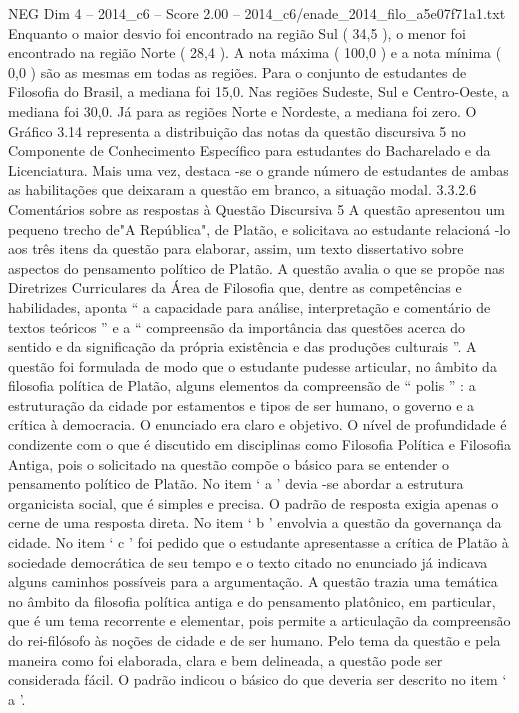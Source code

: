 \begin{textsample}{NEG Dim 4 – 2014\_c6 – Score 2.00 – 2014\_c6/enade\_2014\_filo\_a5e07f71a1.txt}
Enquanto o maior desvio foi encontrado na região Sul ( 34,5 ), o menor foi encontrado na região Norte ( 28,4 ).
A nota máxima ( 100,0 ) e a nota mínima ( 0,0 ) são as mesmas em todas as regiões.
Para o conjunto de estudantes de Filosofia do Brasil, a mediana foi 15,0.
Nas regiões Sudeste, Sul e Centro-Oeste, a mediana foi 30,0.
Já para as regiões Norte e Nordeste, a mediana foi zero.
O Gráfico 3.14 representa a distribuição das notas da questão discursiva 5 no Componente de Conhecimento Específico para estudantes do Bacharelado e da Licenciatura.
Mais uma vez, destaca -se o grande número de estudantes de ambas as habilitações que deixaram a questão em branco, a situação modal. 3.3.2.6 Comentários sobre as respostas à Questão Discursiva 5 A questão apresentou um pequeno trecho de"A República", de Platão, e solicitava ao estudante relacioná -lo aos três itens da questão para elaborar, assim, um texto dissertativo sobre aspectos do pensamento político de Platão.
A questão avalia o que se propõe nas Diretrizes Curriculares da Área de Filosofia que, dentre as competências e habilidades, aponta “ a capacidade para análise, interpretação e comentário de textos teóricos ” e a “ compreensão da importância das questões acerca do sentido e da significação da própria existência e das produções culturais ”.
A questão foi formulada de modo que o estudante pudesse articular, no âmbito da filosofia política de Platão, alguns elementos da compreensão de “ polis ” : a estruturação da cidade por estamentos e tipos de ser humano, o governo e a crítica à democracia.
O enunciado era claro e objetivo.
O nível de profundidade é condizente com o que é discutido em disciplinas como Filosofia Política e Filosofia Antiga, pois o solicitado na questão compõe o básico para se entender o pensamento político de Platão.
No item ‘ a ’ devia -se abordar a estrutura organicista social, que é simples e precisa.
O padrão de resposta exigia apenas o cerne de uma resposta direta.
No item ‘ b ’ envolvia a questão da governança da cidade.
No item ‘ c ’ foi pedido que o estudante apresentasse a crítica de Platão à sociedade democrática de seu tempo e o texto citado no enunciado já indicava alguns caminhos possíveis para a argumentação.
A questão trazia uma temática no âmbito da filosofia política antiga e do pensamento platônico, em particular, que é um tema recorrente e elementar, pois permite a articulação da compreensão do rei-filósofo às noções de cidade e de ser humano.
Pelo tema da questão e pela maneira como foi elaborada, clara e bem delineada, a questão pode ser considerada fácil.
O padrão indicou o básico do que deveria ser descrito no item ‘ a ’.

\end{textsample}
